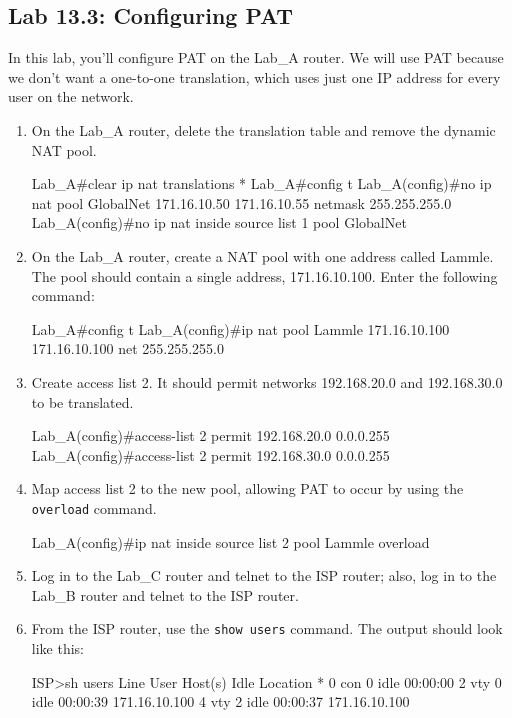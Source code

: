 \subsection{Lab 13.3: Configuring PAT}

In this lab, you'll configure PAT on the Lab\_A router. We will use PAT
because we don't want a one-to-one translation, which uses just one IP
address for every user on the network.

\begin{enumerate}
\item
  On the Lab\_A router, delete the translation table and remove the
  dynamic NAT pool.

\begin{cli}
Lab_A#clear ip nat translations *
Lab_A#config t
Lab_A(config)#no ip nat pool GlobalNet 171.16.10.50
171.16.10.55 netmask 255.255.255.0
Lab_A(config)#no ip nat inside source list 1 pool GlobalNet
\end{cli}
\item
  On the Lab\_A router, create a NAT pool with one address called
  Lammle. The pool should contain a single address, 171.16.10.100. Enter
  the following command:

\begin{cli}
Lab_A#config t
Lab_A(config)#ip nat pool Lammle 171.16.10.100 171.16.10.100
net 255.255.255.0
\end{cli}
\item
  Create access list 2. It should permit networks 192.168.20.0 and
  192.168.30.0 to be translated.

\begin{cli}
Lab_A(config)#access-list 2 permit 192.168.20.0 0.0.0.255
Lab_A(config)#access-list 2 permit 192.168.30.0 0.0.0.255
\end{cli}
\item
  Map access list 2 to the new pool, allowing PAT to occur by using the
  \texttt{overload} command.

\begin{cli}
Lab_A(config)#ip nat inside source list 2 pool Lammle overload
\end{cli}
\item
  Log in to the Lab\_C router and telnet to the ISP router; also, log in
  to the Lab\_B router and telnet to the ISP router.
\item
  From the ISP router, use the \texttt{show\ users} command. The output
  should look like this:

\begin{cli}
ISP>sh users
    Line       User       Host(s)              Idle       Location
*  0 con 0                idle                 00:00:00
   2 vty 0                idle                 00:00:39 171.16.10.100
   4 vty 2                idle                 00:00:37 171.16.10.100
 

\end{cli}
\end{enumerate}
